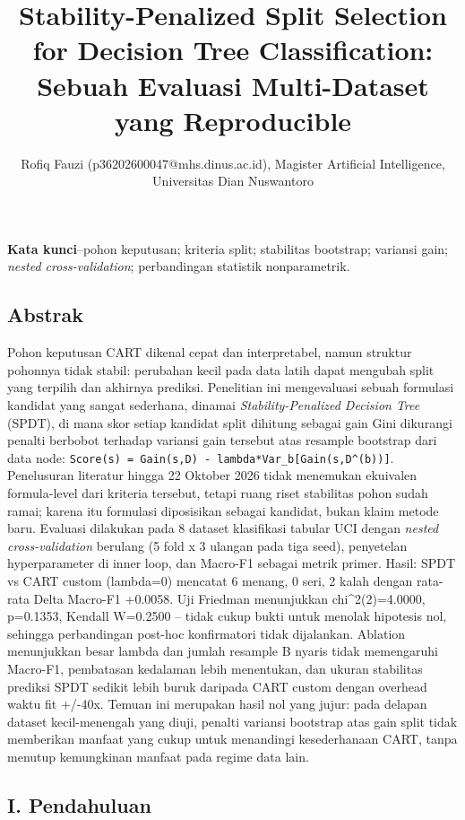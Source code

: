 \documentclass[
  conference]{IEEEtran}
\title{Stability-Penalized Split Selection for Decision Tree
Classification: Sebuah Evaluasi Multi-Dataset yang Reproducible}
\author{Rofiq Fauzi (p36202600047@mhs.dinus.ac.id), Magister Artificial
Intelligence, Universitas Dian Nuswantoro}
\date{}
\begin{document}
\maketitle

\textbf{Kata kunci}--pohon keputusan; kriteria split; stabilitas
bootstrap; variansi gain; \emph{nested cross-validation}; perbandingan
statistik nonparametrik.

\subsection{Abstrak}\label{abstrak}

Pohon keputusan CART dikenal cepat dan interpretabel, namun struktur
pohonnya tidak stabil: perubahan kecil pada data latih dapat mengubah
split yang terpilih dan akhirnya prediksi. Penelitian ini mengevaluasi
sebuah formulasi kandidat yang sangat sederhana, dinamai
\emph{Stability-Penalized Decision Tree} (SPDT), di mana skor setiap
kandidat split dihitung sebagai gain Gini dikurangi penalti berbobot
terhadap variansi gain tersebut atas resample bootstrap dari data node:
\texttt{Score(s)\ =\ Gain(s,D)\ -\ lambda*Var\_b{[}Gain(s,D\^{}(b)){]}}.
Penelusuran literatur hingga 22 Oktober 2026 tidak menemukan ekuivalen
formula-level dari kriteria tersebut, tetapi ruang riset stabilitas
pohon sudah ramai; karena itu formulasi diposisikan sebagai kandidat,
bukan klaim metode baru. Evaluasi dilakukan pada 8 dataset klasifikasi
tabular UCI dengan \emph{nested cross-validation} berulang (5 fold x 3
ulangan pada tiga seed), penyetelan hyperparameter di inner loop, dan
Macro-F1 sebagai metrik primer. Hasil: SPDT vs CART custom (lambda=0)
mencatat 6 menang, 0 seri, 2 kalah dengan rata-rata Delta Macro-F1
+0.0058. Uji Friedman menunjukkan chi\^{}2(2)=4.0000, p=0.1353, Kendall
W=0.2500 -- tidak cukup bukti untuk menolak hipotesis nol, sehingga
perbandingan post-hoc konfirmatori tidak dijalankan. Ablation
menunjukkan besar lambda dan jumlah resample B nyaris tidak memengaruhi
Macro-F1, pembatasan kedalaman lebih menentukan, dan ukuran stabilitas
prediksi SPDT sedikit lebih buruk daripada CART custom dengan overhead
waktu fit +/-40x. Temuan ini merupakan hasil nol yang jujur: pada
delapan dataset kecil-menengah yang diuji, penalti variansi bootstrap
atas gain split tidak memberikan manfaat yang cukup untuk menandingi
kesederhanaan CART, tanpa menutup kemungkinan manfaat pada regime data
lain.

\subsection{I. Pendahuluan}\label{i.-pendahuluan}
\end{document}
